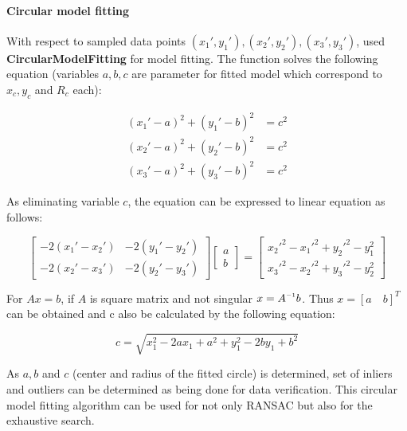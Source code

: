 \documentclass[paper=a4, fontsize=11pt]{scrartcl} %
\numberwithin{equation}{section} %
\numberwithin{figure}{section} %
\numberwithin{table}{section} %
\newcommand{\funcname}[1]{\textbf{#1}}
\newcommand{\inv}{^{\raisebox{.2ex}{$\scriptscriptstyle-1$}}}
\begin{document}
\paragraph{Circular model fitting}

With respect to sampled data points $(x_{1}', y_{1}'), (x_{2}', y_{2}'), (x_{3}', y_{3}')$, used \funcname{CircularModelFitting} for model fitting. The function solves the following equation (variables $a, b, c$ are parameter for fitted model which correspond to $x_c, y_c$ and $R_c$ each):

\begin{align*}
(x_{1}' - a)^{2} + (y_{1}' - b)^{2} &= c^{2} \\
(x_{2}' - a)^{2} + (y_{2}' - b)^{2} &= c^{2} \\
(x_{3}' - a)^{2} + (y_{3}' - b)^{2} &= c^{2}
\end{align*}

As eliminating variable $c$, the equation can be expressed to linear equation as follows:


\begin{equation*}
\begin{bmatrix}
    -2(x_{1}' - x_{2}')       &     -2(y_{1}' - y_{2}') \\
    -2(x_{2}' - x_{3}')       &     -2(y_{2}' - y_{3}') 
\end{bmatrix}
\begin{bmatrix}
    a \\
    b
\end{bmatrix}
=
\begin{bmatrix}
    x_{2}'^{2} - x_{1}'^{2} +  y_{2}'^{2} - y_{1}^{2} \\
    x_{3}'^{2} - x_{2}'^{2} +  y_{3}'^{2} - y_{2}^{2}
\end{bmatrix}
\end{equation*}

For $Ax = b$, if $A$ is square matrix and not singular $x = A \inv b$. Thus $x = [a \quad b]^{T}$ can be obtained and c also be calculated by the following equation: 

\begin{equation*}
c = \sqrt{x_{1}^{2} - 2 a x_{1} +  a^{2} + y_{1}^{2} - 2 b y_{1} + b^{2}}
\end{equation*}

As $a, b$ and $c$ (center and radius of the fitted circle) is determined, set of inliers and outliers can be determined as being done for data verification. This circular model fitting algorithm can be used for not only RANSAC but also for the exhaustive search.
\end{document}
